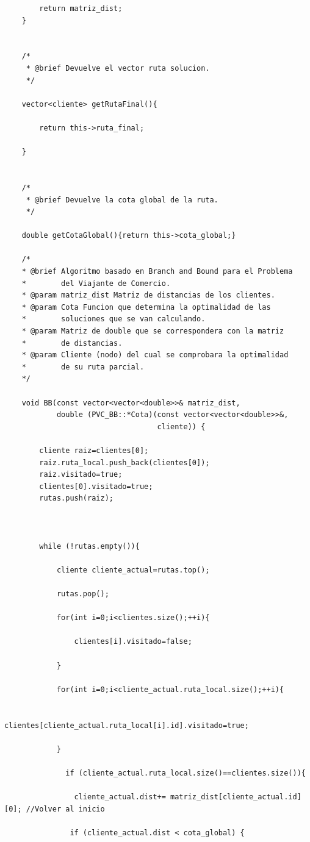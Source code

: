\documentclass[a4paper,12pt,twoside]{article} %
\begin{document}
\begin{lstlisting}
        return matriz_dist;
    }


    /*
     * @brief Devuelve el vector ruta solucion.
     */

    vector<cliente> getRutaFinal(){

        return this->ruta_final;

    }


    /*
     * @brief Devuelve la cota global de la ruta.
     */

    double getCotaGlobal(){return this->cota_global;}

    /*
    * @brief Algoritmo basado en Branch and Bound para el Problema 
    *        del Viajante de Comercio.
    * @param matriz_dist Matriz de distancias de los clientes.
    * @param Cota Funcion que determina la optimalidad de las 
    *        soluciones que se van calculando.
    * @param Matriz de double que se correspondera con la matriz 
    *        de distancias.
    * @param Cliente (nodo) del cual se comprobara la optimalidad 
    *        de su ruta parcial.
    */

    void BB(const vector<vector<double>>& matriz_dist,
            double (PVC_BB::*Cota)(const vector<vector<double>>&,
                                   cliente)) {

        cliente raiz=clientes[0];
        raiz.ruta_local.push_back(clientes[0]);
        raiz.visitado=true;
        clientes[0].visitado=true;
        rutas.push(raiz);



        while (!rutas.empty()){

            cliente cliente_actual=rutas.top();

            rutas.pop();

            for(int i=0;i<clientes.size();++i){

                clientes[i].visitado=false;

            }

            for(int i=0;i<cliente_actual.ruta_local.size();++i){

                clientes[cliente_actual.ruta_local[i].id].visitado=true;

            }

              if (cliente_actual.ruta_local.size()==clientes.size()){

                cliente_actual.dist+= matriz_dist[cliente_actual.id][0]; //Volver al inicio

               if (cliente_actual.dist < cota_global) {


\end{lstlisting}
\end{document}
